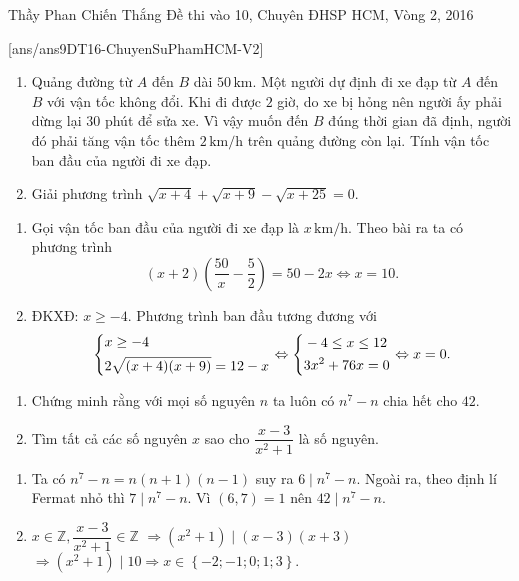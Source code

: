 \begin{name}
{Thầy  Phan Chiến Thắng}
{Đề thi vào 10, Chuyên ĐHSP HCM, Vòng 2, 2016}
\end{name}
\setcounter{ex}{0}
[ans/ans9DT16-ChuyenSuPhamHCM-V2]
\begin{ex}%
    \hfill
    \begin{enumerate}
        \item Quảng đường từ $A$ đến $B$ dài $50\mathrm{\,km}$. Một người dự định đi xe đạp từ $A$ đến $B$ với vận tốc không đổi. Khi đi được $2$ giờ, do xe bị hỏng nên người ấy phải dừng lại $30$ phút để sửa xe. Vì vậy muốn đến $B$ đúng thời gian đã định, người đó phải tăng vận tốc thêm $2\mathrm{\,km/h}$ trên quảng đường còn lại. Tính vận tốc ban đầu của người đi xe đạp.
        \item Giải phương trình $\sqrt{x+4}+\sqrt{x+9}-\sqrt{x+25}=0$.
    \end{enumerate}
\loigiai
    {
    \begin{enumerate}
        \item Gọi vận tốc ban đầu của người đi xe đạp là $x\mathrm{\,km/h}$. Theo bài ra ta có phương trình $$(x+2)\left(\dfrac{50}{x}-\dfrac{5}{2}\right)=50-2x\Leftrightarrow x=10.$$
        \item ĐKXĐ: $x\geq -4$. Phương trình ban đầu tương đương với $$\left\{\begin{aligned}&x\geq -4\\& 2\sqrt{(x+4)(x+9)}=12-x\end{aligned}\right.\Leftrightarrow\left\{\begin{aligned}&-4\leq x\leq 12\\&3x^2+76x=0\end{aligned}\right.\Leftrightarrow x=0.$$
    \end{enumerate}
    }
\end{ex}

\begin{ex}%
\hfill 
    \begin{enumerate}    
        \item Chứng minh rằng với mọi số nguyên $n$ ta luôn có $n^7-n$ chia hết cho $42$.
        \item Tìm tất cả các số nguyên $x$ sao cho $\dfrac{x-3}{x^2+1}$ là số nguyên.
    \end{enumerate}
\loigiai
    {
    \begin{enumerate}
        \item Ta có $n^7-n=n(n+1)(n-1)$ suy ra $6\mid n^7-n$. Ngoài ra, theo định lí Fermat nhỏ thì $7\mid n^7-n$. Vì $(6,7)=1$ nên $42\mid n^7-n.$
        \item $x\in\mathbb{Z},\dfrac{x-3}{x^2+1}\in\mathbb{Z}$ $\Rightarrow (x^2+1)\mid (x-3)(x+3)$ $\Rightarrow (x^2+1)\mid 10\Rightarrow x\in\left\{-2;-1;0;1;3\right\}.$
    \end{enumerate}
    }
\end{ex}

